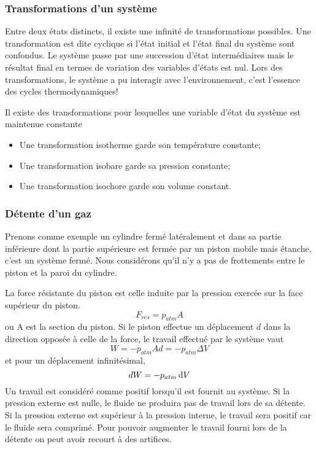 \subsubsection{Transformations d'un système}
Entre deux états distincts,
il existe une infinité de transformations possibles.
Une transformation est dite cyclique si l'état initial et l'état final du
système sont confondus.
Le système passe par une succession d'état intermédiaires mais le résultat
final en termes de variation des variables d'états est nul.
Lors des transformations, le système a pu interagir avec l'environnement,
c'est l'essence des cycles thermodynamiques!

Il existe des transformations pour lesquelles
une variable d'état du système est maintenue constante
\begin{itemize}
  \item Une transformation isotherme garde son température constante;
  \item Une transformation isobare garde sa pression constante;
  \item Une transformation isochore garde son volume constant.
\end{itemize}

\subsubsection{Détente d'un gaz}
Prenons comme exemple un cylindre fermé latéralement et dans
sa partie inférieure dont la partie supérieure est fermée par
un piston mobile mais étanche, c'est un système fermé.
Nous considérons qu'il n'y a pas de frottements
entre le piston et la paroi du cylindre.

La force résistante du piston est celle induite par
la pression exercée sur la face supérieur du piston.
\[ F_{res} = p_{atm}A \]
ou A est la section du piston.
Si le piston effectue un déplacement $d$ dans la direction opposée
à celle de la force, le travail effectué par le système vaut
\[ W = -p_{atm}Ad = -p_{atm}\Delta V \]
et pour un déplacement infinitésimal,
\[  dW = -p_{atm}\operatorname{d}\! V \]
Un travail est considéré comme positif lorsqu'il est fournit au système.
Si la pression externe est nulle,
le fluide ne produira pas de travail lors de sa détente.
Si la pression externe est supérieur à la pression interne,
le travail sera positif car le fluide sera comprimé.
Pour pouvoir augmenter le travail fourni lors de la détente
on peut avoir recourt à des artifices.

